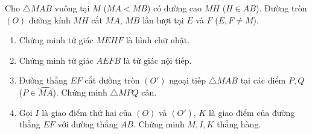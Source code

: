 \begin{ex}%
Cho $\triangle MAB$ vuông tại $M$ ($MA<MB$) có đường cao $MH$ ($H\in AB$). Đường tròn $(O)$ đường kính $MH$ cắt $MA$, $MB$ lần lượt tại $E$ và $F$ ($E,F\neq M$).
\begin{enumerate}
\item Chứng minh tứ giác $MEHF$ là hình chữ nhật.
\item Chứng minh tứ giác $AEFB$ là tứ giác nội tiếp.
\item Đường thẳng $EF$ cắt đường tròn $(O')$ ngoại tiếp $\triangle MAB$ tại các điểm $P,Q$ ($P\in\wideparen{MA}$). Chứng minh $\triangle MPQ$ cân.
\item Gọi $I$ là giao điểm thứ hai của $(O)$ và $(O')$, $K$ là giao điểm của đường thẳng $EF$ với đường thẳng $AB$. Chứng minh $M,I,K$ thẳng hàng.
\end{enumerate}
\end{ex}
